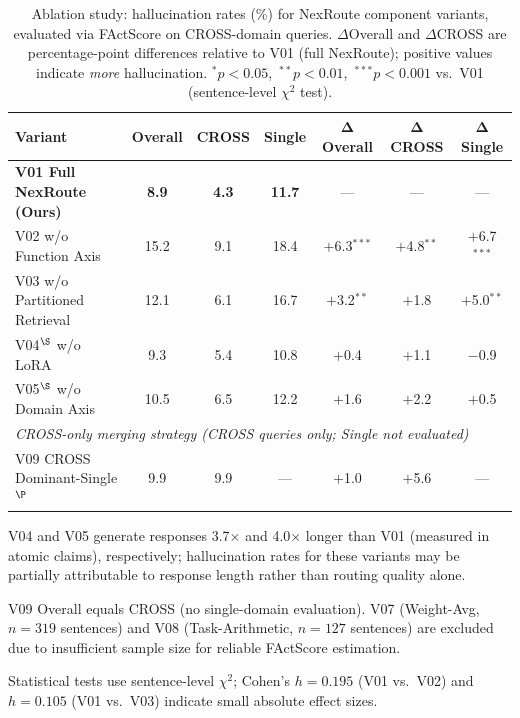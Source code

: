 \documentclass[a4paper,fleql]{cas-sc}
\begin{document}
\begin{table}[t]
\centering
\caption{Ablation study: hallucination rates (\%) for NexRoute component variants,
  evaluated via FActScore on CROSS-domain queries.
  $\Delta$Overall and $\Delta$CROSS are percentage-point differences relative to
  V01 (full NexRoute); positive values indicate \emph{more} hallucination.
  $^*$$p < 0.05$,\ $^{**}$$p < 0.01$,\ $^{***}$$p < 0.001$ vs.\ V01
  (sentence-level $\chi^2$ test).}
\label{tab:factscore_ablation}
\setlength{\tabcolsep}{6pt}
\begin{tabular}{lcccccc}
\toprule
\textbf{Variant}
  & \textbf{Overall}
  & \textbf{CROSS}
  & \textbf{Single}
  & $\boldsymbol{\Delta}$\textbf{Overall}
  & $\boldsymbol{\Delta}$\textbf{CROSS}
  & $\boldsymbol{\Delta}$\textbf{Single} \\
\midrule
\textbf{V01 Full NexRoute (Ours)}
  & \textbf{8.9} & \textbf{4.3} & \textbf{11.7} & --- & --- & --- \\
\midrule
V02 w/o Function Axis
  & 15.2 & 9.1 & 18.4
  & $+$6.3$^{***}$ & $+$4.8$^{**}$ & $+$6.7$^{***}$ \\
V03 w/o Partitioned Retrieval
  & 12.1 & 6.1 & 16.7
  & $+$3.2$^{**}$ & $+$1.8 & $+$5.0$^{**}$ \\
V04$^\S$ w/o LoRA
  & 9.3 & 5.4 & 10.8
  & $+$0.4 & $+$1.1 & $-$0.9 \\
V05$^\S$ w/o Domain Axis
  & 10.5 & 6.5 & 12.2
  & $+$1.6 & $+$2.2 & $+$0.5 \\
\midrule
\multicolumn{7}{l}{\textit{CROSS-only merging strategy (CROSS queries only; Single not evaluated)}} \\
V09 CROSS Dominant-Single$^\P$
  & 9.9 & 9.9 & --- & $+$1.0 & $+$5.6 & --- \\
\bottomrule
\end{tabular}
\begin{tablenotes}[flushleft]\footnotesize
  \item[$\S$] V04 and V05 generate responses 3.7$\times$ and 4.0$\times$ longer than V01
    (measured in atomic claims), respectively; hallucination rates for these variants
    may be partially attributable to response length rather than routing quality alone.
  \item[$\P$] V09 Overall equals CROSS (no single-domain evaluation).
    V07 (Weight-Avg, $n{=}319$ sentences) and V08 (Task-Arithmetic, $n{=}127$ sentences)
    are excluded due to insufficient sample size for reliable FActScore estimation.
  \item Statistical tests use sentence-level $\chi^2$; Cohen's $h{=}0.195$
    (V01 vs.\ V02) and $h{=}0.105$ (V01 vs.\ V03) indicate small absolute effect sizes.
\end{tablenotes}
\end{table}
\end{document}
